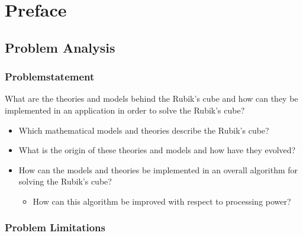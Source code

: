 \part{Preface}
 
\chapter{Problem Analysis}
\section{Problemstatement}
What are the theories and models behind the Rubik's cube and how can they be implemented in an application in order to solve the Rubik's cube?
\begin{itemize}
	\item Which mathematical models and theories describe the Rubik's cube?
	\item What is the origin of these theories and models and how have they evolved?
	\item How can the models and theories be implemented in an overall algorithm for solving the Rubik's cube?
	\begin{itemize}
		\item How can this algorithm be improved with respect to processing power?
	\end{itemize}
\end{itemize}
\section{Problem Limitations}
	
	
	